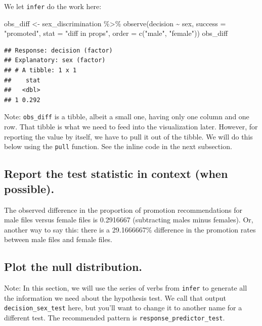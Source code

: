 \documentclass[
]{book}
\newenvironment{Shaded}{\begin{snugshade}}{\end{snugshade}}
\newcommand{\AttributeTok}[1]{\textcolor[rgb]{0.77,0.63,0.00}{#1}}
\newcommand{\FunctionTok}[1]{\textcolor[rgb]{0.00,0.00,0.00}{#1}}
\newcommand{\NormalTok}[1]{#1}
\newcommand{\OtherTok}[1]{\textcolor[rgb]{0.56,0.35,0.01}{#1}}
\newcommand{\SpecialCharTok}[1]{\textcolor[rgb]{0.00,0.00,0.00}{#1}}
\newcommand{\StringTok}[1]{\textcolor[rgb]{0.31,0.60,0.02}{#1}}
\begin{document}
We let \texttt{infer} do the work here:

\begin{Shaded}
\begin{Highlighting}[]
\NormalTok{obs\_diff }\OtherTok{\textless{}{-}}\NormalTok{ sex\_discrimination }\SpecialCharTok{\%\textgreater{}\%}
    \FunctionTok{observe}\NormalTok{(decision }\SpecialCharTok{\textasciitilde{}}\NormalTok{ sex, }\AttributeTok{success =} \StringTok{"promoted"}\NormalTok{,}
            \AttributeTok{stat =} \StringTok{"diff in props"}\NormalTok{, }\AttributeTok{order =} \FunctionTok{c}\NormalTok{(}\StringTok{"male"}\NormalTok{, }\StringTok{"female"}\NormalTok{))}
\NormalTok{obs\_diff}
\end{Highlighting}
\end{Shaded}

\begin{verbatim}
## Response: decision (factor)
## Explanatory: sex (factor)
## # A tibble: 1 x 1
##    stat
##   <dbl>
## 1 0.292
\end{verbatim}

Note: \texttt{obs\_diff} is a tibble, albeit a small one, having only one column and one row. That tibble is what we need to feed into the visualization later. However, for reporting the value by itself, we have to pull it out of the tibble. We will do this below using the \texttt{pull} function. See the inline code in the next subsection.

\hypertarget{hypothesis1-ex-report-test-stat}{%
\subsection{Report the test statistic in context (when possible).}\label{hypothesis1-ex-report-test-stat}}

The observed difference in the proportion of promotion recommendations for male files versus female files is 0.2916667 (subtracting males minus females). Or, another way to say this: there is a 29.1666667\% difference in the promotion rates between male files and female files.

\hypertarget{hypothesis1-ex-plot-null}{%
\subsection{Plot the null distribution.}\label{hypothesis1-ex-plot-null}}

Note: In this section, we will use the series of verbs from \texttt{infer} to generate all the information we need about the hypothesis test. We call that output \texttt{decision\_sex\_test} here, but you'll want to change it to another name for a different test. The recommended pattern is \texttt{response\_predictor\_test}.
\end{document}
